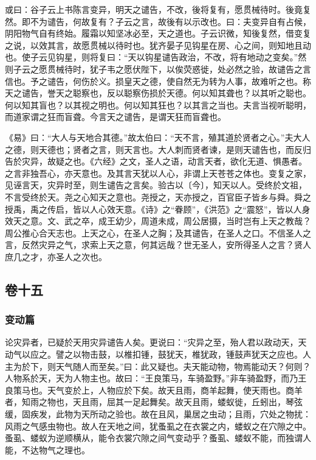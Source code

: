 \documentclass[]{article}
\begin{document}
或曰：谷子云上书陈言变异，明天之谴告，不改，後将复有，愿贯械待时。後竟复然。即不为谴告，何故复有？子云之言，故後有以示改也。曰：夫变异自有占候，阴阳物气自有终始。履霜以知坚冰必至，天之道也。子云识微，知後复然，借变复之说，以效其言，故愿贯械以待时也。犹齐晏子见钩星在房、心之间，则知地且动也。使子云见钩星，则将复曰：``天以钩星谴告政治，不改，将有地动之变矣。''然则子云之愿贯械待时，犹子韦之愿伏陛下，以俟荧惑徙，处必然之验，故谴告之言信也。予之谴告，何伤於义。损皇天之德，使自然无为转为人事，故难听之也。称天之谴告，誉天之聪察也，反以聪察伤损於天德。何以知其聋也？以其听之聪也。何以知其盲也？以其视之明也。何以知其狂也？以其言之当也。夫言当视听聪明，而道家谓之狂而盲聋。今言天之谴告，是谓天狂而盲聋也。

《易》曰：``大人与天地合其德。''故太伯曰：``天不言，殖其道於贤者之心。''夫大人之德，则天德也；贤者之言，则天言也。大人刺而贤者谏，是则天谴告也，而反归告於灾异，故疑之也。《六经》之文，圣人之语，动言天者，欲化无道、惧愚者。之言非独吾心，亦天意也。及其言天犹以人心，非谓上天苍苍之体也。变复之家，见诬言天，灾异时至，则生谴告之言矣。验古以〔今〕，知天以人。受终於文祖，不言受终於天。尧之心知天之意也。尧授之，天亦授之，百官臣子皆乡与舜。舜之授禹，禹之传启，皆以人心效天意。《诗》之``眷顾''，《洪范》之``震怒''，皆以人身效天之意。文、武之卒，成王幼少，周道未成，周公居摄，当时岂有上天之教哉？周公推心合天志也。上天之心，在圣人之胸；及其谴告，在圣人之口。不信圣人之言，反然灾异之气，求索上天之意，何其远哉？世无圣人，安所得圣人之言？贤人庶几之才，亦圣人之次也。

\hypertarget{header-n619}{%
\subsection{卷十五}\label{header-n619}}

\hypertarget{header-n620}{%
\subsubsection{变动篇}\label{header-n620}}

论灾异者，已疑於天用灾异谴告人矣。更说曰：``灾异之至，殆人君以政动天，天动气以应之。譬之以物击鼓，以椎扣锺，鼓犹天，椎犹政，锺鼓声犹天之应也。人主为於下，则天气随人而至矣。''曰：此又疑也。夫天能动物，物焉能动天？何则？人物系於天，天为人物主也。故曰：``王良策马，车骑盈野。''非车骑盈野，而乃王良策马也。天气变於上，人物应於下矣。故天且雨，商羊起舞，使天雨也。商羊者，知雨之物也，天且雨，屈其一足起舞矣。故天且雨，蝼蚁徙，丘蚓出，琴弦缓，固疾发，此物为天所动之验也。故在且风，巢居之虫动；且雨，穴处之物扰：风雨之气感虫物也。故人在天地之间，犹蚤虱之在衣裳之内，蝼蚁之在穴隙之中。蚤虱、蝼蚁为逆顺横从，能令衣裳穴隙之间气变动乎？蚤虱、蝼蚁不能，而独谓人能，不达物气之理也。
\end{document}
